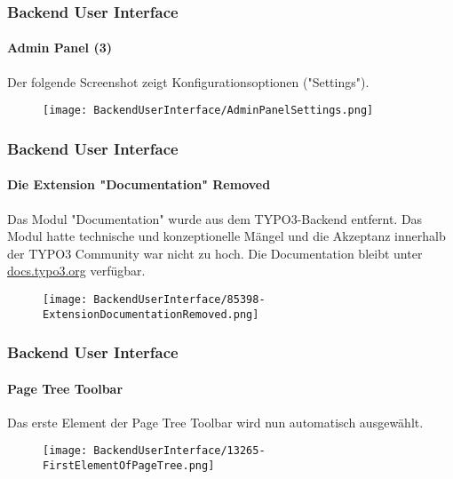 
\begin{frame}[fragile]
	\frametitle{Backend User Interface}
	\framesubtitle{Admin Panel (3)}

	Der folgende Screenshot zeigt Konfigurationsoptionen ("Settings").

	\begin{figure}
		\texttt{[image: BackendUserInterface/AdminPanelSettings.png]}
	\end{figure}

\end{frame}


\begin{frame}[fragile]
	\frametitle{Backend User Interface}
	\framesubtitle{Die Extension "Documentation" Removed}

	Das Modul "Documentation" wurde aus dem TYPO3-Backend entfernt.
    Das Modul hatte technische und konzeptionelle Mängel und die Akzeptanz innerhalb der TYPO3 Community  
    war nicht zu hoch.
    \newline
    Die Documentation bleibt unter \href{https://docs.typo3.org}{docs.typo3.org} verfügbar.

	\begin{figure}
		\texttt{[image: BackendUserInterface/85398-ExtensionDocumentationRemoved.png]}
	\end{figure}

\end{frame}


\begin{frame}[fragile]
	\frametitle{Backend User Interface}
	\framesubtitle{Page Tree Toolbar}

	Das erste Element der Page Tree Toolbar wird nun automatisch ausgewählt.

	\begin{figure}
		\texttt{[image: BackendUserInterface/13265-FirstElementOfPageTree.png]}
	\end{figure}

\end{frame}

